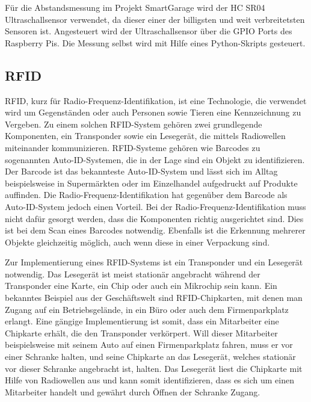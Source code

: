 Für die Abstandsmessung im Projekt SmartGarage wird der HC SR04 Ultraschallsensor verwendet, da dieser einer der billigsten und weit verbreitetsten Sensoren ist. Angesteuert wird der Ultraschallsensor über die GPIO Ports des Raspberry Pis. Die Messung selbst wird mit Hilfe eines Python-Skripts gesteuert. 


																																																																																			 

\subsection{RFID}
RFID, kurz für Radio-Frequenz-Identifikation, ist eine Technologie, die verwendet wird um Gegenständen oder auch Personen sowie Tieren eine Kennzeichnung zu Vergeben. Zu einem solchen RFID-System gehören zwei grundlegende Komponenten, ein Transponder sowie ein Lesegerät, die mittels Radiowellen miteinander kommunizieren. RFID-Systeme gehören wie Barcodes zu sogenannten Auto-ID-Systemen, die in der Lage sind ein Objekt zu identifizieren. Der Barcode ist das bekannteste Auto-ID-System und lässt sich im Alltag beispielsweise in Supermärkten oder im Einzelhandel aufgedruckt auf Produkte auffinden. Die Radio-Frequenz-Identifikation hat gegenüber dem Barcode als Auto-ID-System jedoch einen Vorteil. Bei der Radio-Frequenz-Identifikation muss nicht dafür gesorgt werden, dass die Komponenten richtig ausgerichtet sind. Dies ist bei dem Scan eines Barcodes notwendig. Ebenfalls ist die Erkennung mehrerer Objekte gleichzeitig möglich, auch wenn diese in einer Verpackung sind.\autocite[Vgl.][S. 11]{rfid2}

Zur Implementierung eines RFID-Systems ist ein Transponder und ein Lesegerät notwendig. Das Lesegerät ist meist stationär angebracht während der Transponder eine Karte, ein Chip oder auch ein Mikrochip sein kann.\autocite[Vgl.][S. 33]{rfid} Ein bekanntes Beispiel aus der Geschäftswelt sind RFID-Chipkarten, mit denen man Zugang auf ein Betriebsgelände, in ein Büro oder auch dem Firmenparkplatz erlangt. Eine gängige Implementierung ist somit, dass ein Mitarbeiter eine Chipkarte erhält, die den Transponder verkörpert. Will dieser Mitarbeiter beispielsweise mit seinem Auto auf einen Firmenparkplatz fahren, muss er vor einer Schranke halten, und seine Chipkarte an das Lesegerät, welches stationär vor dieser Schranke angebracht ist, halten. Das Lesegerät liest die Chipkarte mit Hilfe von Radiowellen aus und kann somit identifizieren, dass es sich um einen Mitarbeiter handelt und gewährt durch Öffnen der Schranke Zugang.

